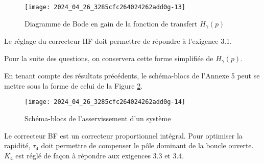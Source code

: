 
\begin{figure}[!h]
\centering
\texttt{[image: 2024\_04\_26\_3285cfc264024262add0g-13]}
\caption{\label{ccmp2023_fig_12} Diagramme de Bode en gain de la fonction de transfert $H_{\gamma}(p)$}
\end{figure}



Le réglage du correcteur HF doit permettre de répondre à l'exigence 3.1.



Pour la suite des questions, on conservera cette forme simplifiée de $H_{\gamma}(p)$.


En tenant compte des résultats précédents, le schéma-blocs de l'Annexe 5 peut se mettre sous la forme de celui de la Figure \ref{ccmp2023_fig_13}.

\begin{figure}[!h]
\centering
\texttt{[image: 2024\_04\_26\_3285cfc264024262add0g-14]}
\caption{\label{ccmp2023_fig_13}  Schéma-blocs de l'asservissement d'un système}
\end{figure}



Le correcteur BF est un correcteur proportionnel intégral. Pour optimiser la rapidité, $\tau_{4}$ doit permettre de compenser le pôle dominant de la boucle ouverte. $K_{4}$ est réglé de façon à répondre aux exigences 3.3 et 3.4.

